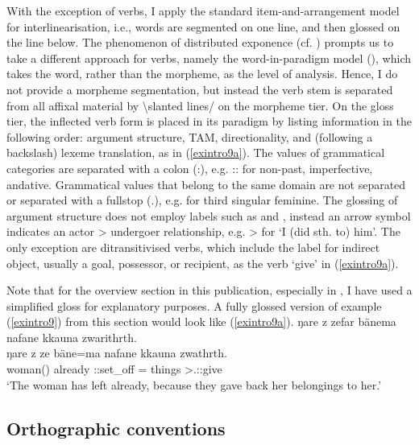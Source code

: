 With the exception of verbs, I apply the standard item-and-arrangement model for interlinearisation, i.e., words are segmented on one line, and then glossed on the line below. The phenomenon of distributed exponence (cf. ) prompts us to take a different approach for verbs, namely the word-in-paradigm model (\cite{Matthews:1974yw}), which takes the word, rather than the morpheme, as the level of analysis. Hence, I do not provide a morpheme segmentation, but instead the verb stem is separated from all affixal material by {\textbackslash}slanted lines/ on the morpheme tier. On the gloss tier, the inflected verb form is placed in its paradigm by listing information in the following order: argument structure, TAM, directionality, and (following a backslash) lexeme translation, as in (\ref{exintro9a}). The values of grammatical categories are separated with a colon (:), e.g. :: for non-past, imperfective, andative. Grammatical values that belong to the same domain are not separated or separated with a fullstop (.), e.g.  for third singular feminine. The glossing of argument structure does not employ labels such as  and , instead an arrow symbol indicates an actor > undergoer relationship, e.g. > for `I (did sth. to) him'. The only exception are ditransitivised verbs, which include the label  for indirect object, usually a goal, possessor, or recipient, as the verb `give' in (\ref{exintro9a}).

Note that for the overview section in this publication, especially in , I have used a simplified gloss for explanatory purposes. A fully glossed version of example (\ref{exintro9}) from this section would look like (\ref{exintro9a}).
\newpage
\ea \label{exintro9a}
    ŋare z zefar bänema nafane kkauna zwarithrth.\\
	\gll ŋare z ze bäne=ma nafane kkauna zwathrth.\\
	woman() already ::set\_off =  things >.::give\\
	\glt `The woman has left already, because they gave back her belongings to her.'\\
\z

\subsection{Orthographic conventions}\label{sec:orthography}

